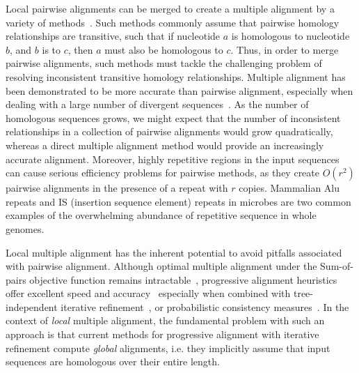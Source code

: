 \documentclass[12pt,journal,draftcls,letterpaper,onecolumn]{IEEEtran}
\begin{document}
Local pairwise alignments can be merged to create a multiple alignment by a variety of
methods~\cite{ref-tba,ref-dialign,ref-related1}. Such methods commonly assume that pairwise homology relationships are transitive, such that if nucleotide $a$ is homologous to nucleotide $b$, and $b$ is to $c$, then $a$ must also be homologous to $c$.  Thus, in order to merge pairwise alignments, such methods must tackle the challenging problem of resolving inconsistent transitive homology relationships.
Multiple alignment has been demonstrated to be more accurate than pairwise alignment, especially when dealing with a large number of divergent sequences~\cite{ref-mlagan,ref-aubergene}.  As the number of homologous sequences grows, we might expect that the number of inconsistent relationships in a collection of pairwise alignments would grow quadratically, whereas a direct multiple alignment method would provide an increasingly accurate alignment.  Moreover, highly repetitive regions in the input sequences can cause serious efficiency
problems for pairwise methods, as they create $O(r^{2})$ pairwise alignments in the presence of a repeat with $r$ copies.  Mammalian Alu repeats and IS (insertion sequence element) repeats in microbes are two common examples of the overwhelming abundance of repetitive sequence in whole genomes.

Local multiple alignment has the inherent potential to avoid pitfalls associated with pairwise alignment. Although optimal multiple alignment under the Sum-of-pairs objective function remains intractable~\cite{ref-wangjiang}, progressive alignment heuristics offer excellent speed and accuracy~\cite{ref-clustalw,ref-tcoffee} especially when combined with tree-independent iterative
refinement~\cite{ref-muscle}, or probabilistic consistency measures~\cite{ref-probcons}. In the context of \textit{local}
multiple alignment, the fundamental problem with such an approach is
that current methods for progressive alignment with iterative
refinement compute \textit{global} alignments, i.e. they implicitly
assume that input sequences are homologous over their entire length. 
\end{document}
